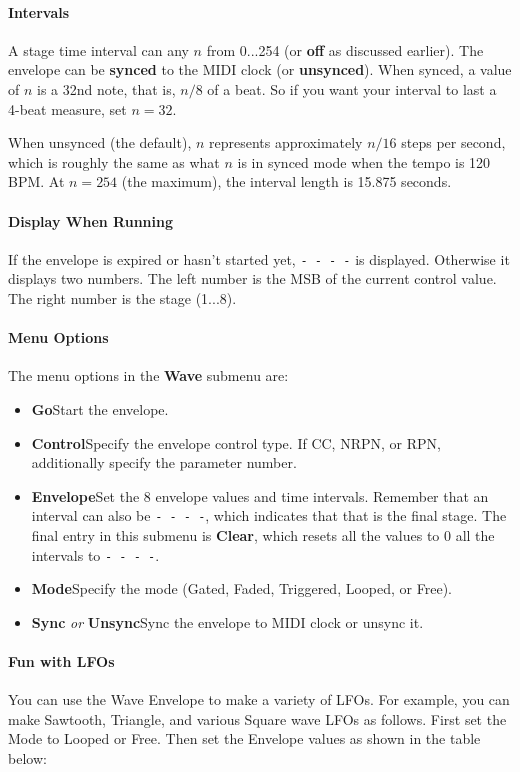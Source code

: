\documentclass{article}
\begin{document}
\paragraph{Intervals} A stage time interval can any \(n\) from 0...254 (or {\bf off} as discussed earlier).  The envelope can be {\bf synced} to the MIDI clock (or {\bf unsynced}). When synced, a value of \(n\) is a 32nd note, that is, \(n/8\) of a beat.  So if you want your interval to last a 4-beat measure, set \(n=32\).

When unsynced (the default), \(n\) represents approximately \(n/16\) steps per second, which is roughly the same as what \(n\) is in synced mode when the tempo is 120 BPM.    At \(n=254\) (the maximum), the interval length is 15.875 seconds.

\paragraph{Display When Running}  If the envelope is expired or hasn't started yet,  \texttt{-~-~-~-} is displayed.  Otherwise it displays two numbers.  The left number is the MSB of the current control value.  The right number is the stage (1...8).

\paragraph{Menu Options}  The menu options in the {\bf Wave} submenu are:

\begin{itemize}
\item {\bf Go}\quad Start the envelope.
\item {\bf Control}\quad Specify the envelope control type.  If CC, NRPN, or RPN, additionally specify the parameter number. 
\item {\bf Envelope}\quad Set the 8 envelope values and time intervals.  Remember that an interval can also be \texttt{-~-~-~-}, which indicates that that is the final stage.  The final entry in this submenu is {\bf Clear}, which resets all the values to 0 all the intervals to \texttt{-~-~-~-}. 
\item {\bf Mode}\quad Specify the mode (Gated, Faded, Triggered, Looped, or Free).
\item {\bf Sync} {\it or} {\bf Unsync}\quad Sync the envelope to MIDI clock or unsync it.
\end{itemize}

\paragraph{Fun with LFOs}  You can use the Wave Envelope to make a variety of LFOs.  For example, you can make Sawtooth, Triangle, and various Square wave LFOs as follows.  First set the Mode to Looped or Free.  Then set the Envelope values as shown in the table below:
\end{document}
